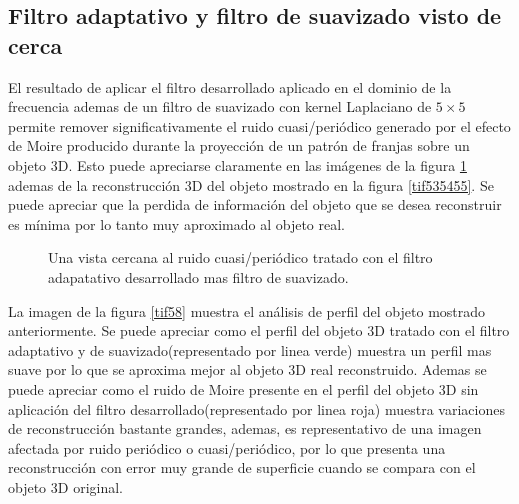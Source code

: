 \documentclass[10pt,letterpaper]{article}
\begin{document}
\subsection{Filtro adaptativo y filtro de suavizado visto de cerca}
El resultado de aplicar el filtro desarrollado aplicado en el dominio de la frecuencia ademas de un filtro de suavizado con kernel Laplaciano de $5 \times 5$ permite remover significativamente el ruido cuasi/periódico generado por el efecto de Moire producido durante la proyección de un patrón de franjas sobre un objeto 3D. Esto puede apreciarse claramente en las imágenes de la figura \ref{tif5657} ademas de la reconstrucción 3D del objeto mostrado en la figura \ref{tif535455}. Se puede apreciar que la perdida de información del objeto que se desea reconstruir es mínima por lo tanto muy aproximado al objeto real.

\begin{figure}[H]
      \begin{center}
        \caption{Una vista cercana al ruido cuasi/periódico tratado con el filtro adapatativo desarrollado mas filtro de suavizado.}
        \label{tif5657}
      \end{center}
\end{figure}

La imagen de la figura \ref{tif58} muestra el análisis de perfil del objeto mostrado anteriormente. Se puede apreciar como el perfil del objeto 3D tratado con el filtro adaptativo y de suavizado(representado por linea verde) muestra un perfil mas suave por lo que se aproxima mejor al objeto 3D real reconstruido. Ademas se puede apreciar como el ruido de Moire presente en el perfil del objeto 3D sin aplicación del filtro desarrollado(representado por linea roja) muestra variaciones de reconstrucción bastante grandes, ademas, es representativo de una imagen afectada por ruido periódico o cuasi/periódico, por lo que presenta una reconstrucción con error muy grande de superficie cuando se compara con el objeto 3D original.
\end{document}

